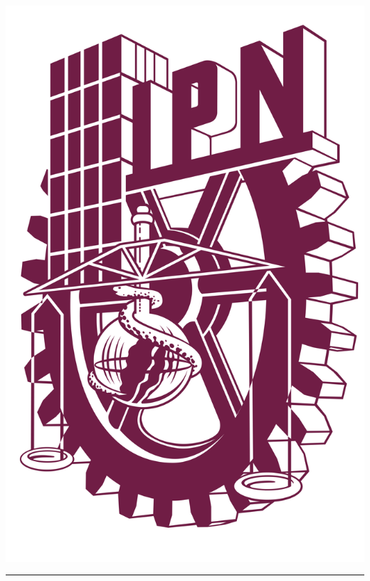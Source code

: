 \documentclass[12pt]{report}
\begin{document}


\begin{minipage}{0.2\textwidth}
    \includegraphics[width=\textwidth]{logo-ipn-guinda.png}
    \hspace{-\textwidth} %
    \vspace{-\topskip}   %
\end{minipage}%
\begin{minipage}{0.2\textwidth}
    \vspace{1.5cm} %
    \noindent\rule{10cm}{0.5pt}
\end{minipage}%
\end{document}
